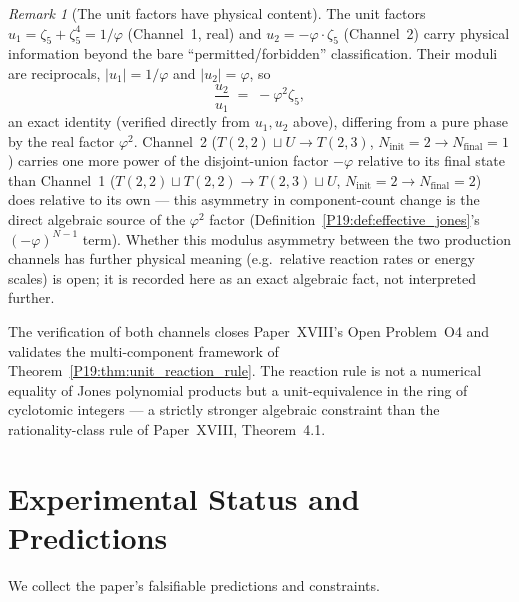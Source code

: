 \documentclass[11pt,a4paper]{article}
\theoremstyle{definition}\newtheorem{definition}[theorem]{Definition}
\theoremstyle{remark}
\newtheorem{remark}[theorem]{Remark}
\newcommand{\vp}{\varphi}
\begin{document}
\begin{remark}[The unit factors have physical content]
\label{P19:rem:unit_meaning}
The unit factors $u_1=\zeta_5+\zeta_5^4=1/\vp$ (Channel~1, real) and
$u_2=-\vp\cdot\zeta_5$ (Channel~2) carry physical information beyond
the bare ``permitted/forbidden'' classification. Their moduli are
reciprocals, $|u_1|=1/\vp$ and $|u_2|=\vp$,
so
\begin{equation}
  \frac{u_2}{u_1} \;=\; -\vp^2\zeta_5,
  \label{P19:eq:channel_ratio}
\end{equation}
an exact identity (verified directly from $u_1,u_2$ above), differing
from a pure phase by the real factor $\vp^2$.  Channel~2
($T(2,2)\sqcup U\to T(2,3)$, $N_{\mathrm{init}}=2\to N_{\mathrm{final}}=1$)
carries one more power of the disjoint-union factor $-\vp$ relative
to its final state than Channel~1
($T(2,2)\sqcup T(2,2)\to T(2,3)\sqcup U$, $N_{\mathrm{init}}=2\to
N_{\mathrm{final}}=2$) does relative to its own --- this asymmetry in
component-count change is the direct algebraic source of the
$\vp^2$ factor (Definition~\ref{P19:def:effective_jones}'s
$(-\vp)^{N-1}$ term). Whether this modulus asymmetry between the
two production channels has further physical meaning (e.g.\ relative
reaction rates or energy scales) is open; it is recorded here as an
exact algebraic fact, not interpreted further.
\end{remark}

The verification of both channels closes Paper~XVIII's Open
Problem~O4 and validates the multi-component framework of
Theorem~\ref{P19:thm:unit_reaction_rule}.  The reaction rule is
not a numerical equality of Jones polynomial products but a
unit-equivalence in the ring of cyclotomic integers --- a
strictly stronger algebraic constraint than the rationality-class
rule of Paper~XVIII, Theorem~4.1. %

\section{Experimental Status and Predictions}
\label{P19:sec:experiment}

We collect the paper's falsifiable predictions and constraints.
\end{document}
